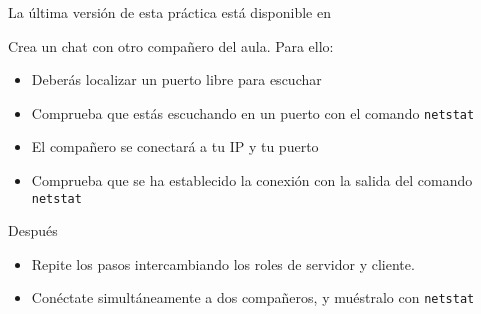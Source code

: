 
\usepackage{eurosym}


\renewcommand{\hmwkClass}{Planificación y Administración de Redes}
\renewcommand{\hmwkTitle}{Práctica de conexiones TCP}









\primerapagina

\setlength{\parindent}{0em}
\setlength{\parskip}{1em}



La última versión de esta práctica está disponible en 



\begin{homeworkProblem}
  Crea un chat con otro compañero del aula. Para ello:
  \begin{itemize}
  \item Deberás localizar un puerto libre para escuchar
  \item Comprueba que estás escuchando en un puerto con el comando \texttt{netstat}
  \item El compañero se conectará a tu IP y tu puerto
  \item Comprueba que se ha establecido la conexión con la salida del comando \texttt{netstat}
  \end{itemize}

  Después
  \begin{itemize}
  \item Repite los pasos intercambiando los roles de servidor y cliente.
  \item Conéctate simultáneamente a dos compañeros, y muéstralo con \texttt{netstat}
  \end{itemize}
\end{homeworkProblem}


